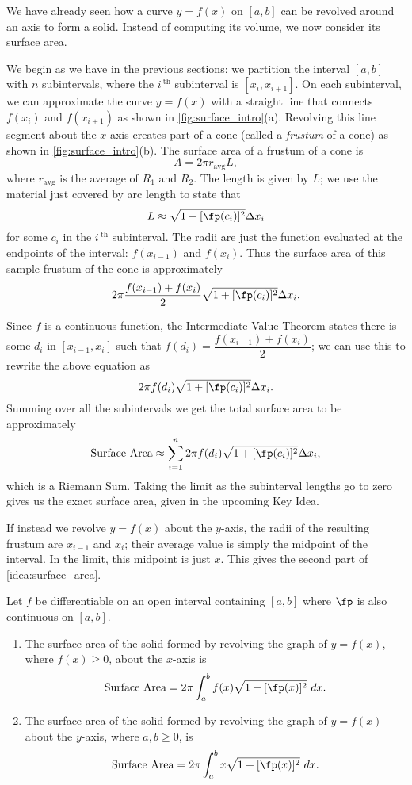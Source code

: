 We have already seen how a curve $y=f(x)$ on $[a,b]$ can be revolved around an axis to form a solid. Instead of computing its volume, we now consider its surface area.

We begin as we have in the previous sections: we partition the interval $[a,b]$ with $n$ subintervals, where the $i\,^{\text{th}}$ subinterval is $[x_i,x_{i+1}]$. On each subinterval, we can approximate the curve $y=f(x)$ with a straight line that connects $f(x_i)$ and $f(x_{i+1})$ as shown in \autoref{fig:surface_intro}(a). Revolving this line segment about the $x$-axis creates part of a cone (called a \textit{frustum} of a cone) as shown in \autoref{fig:surface_intro}(b). The surface area of a frustum of a cone is
\[A=2\pi r_{\text{avg}} L,\]
where $r_{\text{avg}}$ is the average of $R_1$ and $R_2$.  The length is given by $L$; we use the material just covered by arc length to state that
\[L\approx \sqrt{1+[\fp(c_i)]^2}\Delta x_i\]
for some $c_i$ in the $i\,^\text{th}$ subinterval. The radii are just the function evaluated at the endpoints of the interval: $f(x_{i-1})$ and $f(x_i)$. Thus the surface area of this sample frustum of the cone is approximately 
\[2\pi\frac{f(x_{i-1})+f(x_i)}2\sqrt{1+[\fp(c_i)]^2}\Delta x_i.\]

Since $f$ is a continuous function, the Intermediate Value Theorem states there is some $d_i$ in $[x_{i-1},x_i]$ such that $f(d_i)=\dfrac{f(x_{i-1})+f(x_i)}2$; we can use this to rewrite the above equation as
\[2\pi f(d_i)\sqrt{1+[\fp(c_i)]^2}\Delta x_i.\]
Summing over all the subintervals we get the total surface area to be approximately 
\[\text{Surface Area}\approx \sum_{i=1}^n 2\pi f(d_i)\sqrt{1+[\fp(c_i)]^2}\Delta x_i,\]
which is a Riemann Sum. Taking the limit as the subinterval lengths go to zero gives us the exact surface area, given in the upcoming Key Idea.

If instead we revolve $y=f(x)$ about the $y$-axis, the radii of the resulting frustum are $x_{i-1}$ and $x_i$; their average value is simply the midpoint of the interval. In the limit, this midpoint is just $x$. This gives the second part of \autoref{idea:surface_area}.

\begin{keyidea}\label{idea:surface_area}
Let $f$ be differentiable on an open interval containing $[a,b]$ where $\fp$ is also continuous on $[a,b]$. 
\begin{enumerate}
	\item	The surface area of the solid formed by revolving the graph of $y=f(x)$, where $f(x)\geq0$, about the $x$-axis is
	\[\text{Surface Area} = 2\pi\int_a^b f(x)\sqrt{1+[\fp(x)]^2}\ dx.\]
	\item	The surface area of the solid formed by revolving the graph of $y=f(x)$ about the $y$-axis, where $a,b\geq0$, is
	\[\text{Surface Area} = 2\pi\int_a^b x\sqrt{1+[\fp(x)]^2}\ dx.\]
\end{enumerate}
\end{keyidea}

